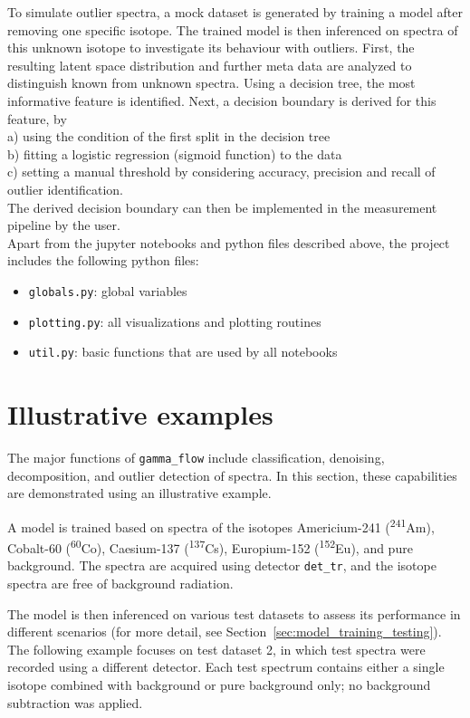 \documentclass[preprint,12pt, a4paper]{elsarticle}
\begin{document}
To simulate outlier spectra, a mock dataset is generated by training a model after removing one specific isotope. The trained model is then inferenced on spectra of this unknown isotope to investigate its behaviour with outliers. 
First, the resulting latent space distribution and further meta data are analyzed to distinguish known from unknown spectra. Using a decision tree, the most informative feature is identified. 
Next, a decision boundary is derived for this feature, by  \\
a) using the condition of the first split in the decision tree \\
b) fitting a logistic regression (sigmoid function) to the data \\ 
c) setting a manual threshold by considering accuracy, precision and recall of outlier identification. \\
The derived decision boundary can then be implemented in the measurement pipeline by the user. \\


Apart from the jupyter notebooks and python files described above, the project includes the following python files:  
\begin{itemize}
\item \texttt{globals.py}: global variables  
\item \texttt{plotting.py}: all visualizations and plotting routines    
\item \texttt{util.py}: basic functions that are used by all notebooks  
\end{itemize}


\section{Illustrative examples}

The major functions of \texttt{gamma\_flow} include classification, denoising, decomposition, and outlier detection of spectra. In this section, these capabilities are demonstrated using an illustrative example. 

A model is trained based on spectra of the isotopes Americium-241 (\textsuperscript{241}Am), Cobalt-60 (\textsuperscript{60}Co), Caesium-137 (\textsuperscript{137}Cs), Europium-152 (\textsuperscript{152}Eu), and pure background. The spectra are acquired using detector \texttt{det\_tr}, and the isotope spectra are free of background radiation.

The model is then inferenced on various test datasets to assess its performance in different scenarios (for more detail, see Section~\ref{sec:model_training_testing}). The following example focuses on test dataset 2, in which test spectra were recorded using a different detector. Each test spectrum contains either a single isotope combined with background or pure background only; no background subtraction was applied.
\end{document}
